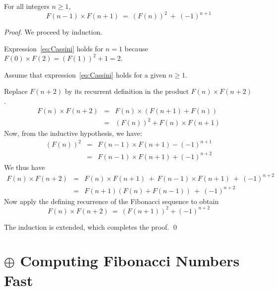 \begin{prop} 
For all integers $n \geq 1$,
\begin{equation}
\label{eq:Cassini}
F(n-1) \times F(n+1) \ = \ (F(n))^2 \ + \ (-1)^{n+1}
\end{equation}
\end{prop}

\begin{proof}
We proceed by induction.

\smallskip

Expression~\ref{eq:Cassini} holds for $n=1$ because $F(0) \times F(2) = (F(1))^2 +1 = 2$.

\medskip

Assume that expression~\ref{eq:Cassini} holds for a given $n \geq 1$.

\medskip

Replace $F(n+2)$ by its recurrent definition in the product $F(n) \times F(n+2)$.
\begin{eqnarray*}
F(n) \times F(n+2) & = & F(n) \times (F(n+1)+F(n)) \\
                              & = & (F(n))^2 + F(n) \times F(n+1)
\end{eqnarray*}                   
Now, from the inductive hypothesis, we have:
\begin{eqnarray*}
(F(n))^2 & = & F(n-1) \times F(n+1) - (-1)^{n+1} \\
              & = & F(n-1) \times F(n+1) + (-1)^{n+2}
\end{eqnarray*}
We thus have
\begin{eqnarray*}
F(n) \times F(n+2) & = & F(n) \times F(n+1) \ + \ F(n-1) \times F(n+1) \ + \ (-1)^{n+2} \\
                              & = & F(n+1) (F(n) + F(n-1)) \ + \ (-1)^{n+2}
\end{eqnarray*}
Now apply the defining recurrence of the Fibonacci sequence to obtain
\[ F(n) \times F(n+2) \ = \ (F(n+1))^2 + (-1)^{n+2} \]

\smallskip

\noindent
The induction is extended, which completes the proof.  \qed
\end{proof}


\section{$\oplus$ Computing Fibonacci Numbers Fast}
\label{sec:FastFibo}


